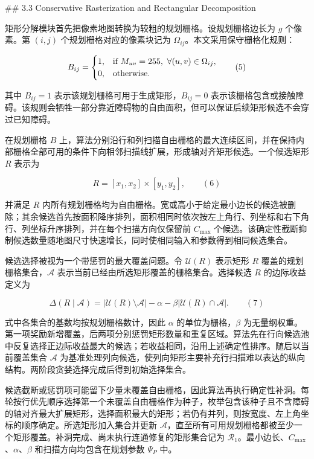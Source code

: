 ## 3.3 Conservative Rasterization and Rectangular Decomposition

  

矩形分解模块首先把像素地图转换为较粗的规划栅格。设规划栅格边长为 $g$ 个像素。第 $(i,j)$ 个规划栅格对应的像素块记为 $\Omega_{ij}$。本文采用保守栅格化规则：

  

$$
B_{ij}=
\begin{cases}
1, & \text{if } M_{uv}=255,\ \forall (u,v)\in\Omega_{ij},\cr
0, & \text{otherwise}.
\end{cases}
\qquad(5)
$$

  

其中 $B_{ij}=1$ 表示该规划栅格可用于生成矩形，$B_{ij}=0$ 表示该栅格包含或接触障碍。该规则会牺牲一部分靠近障碍物的自由面积，但可以保证后续矩形候选不会穿过已知障碍。

  

在规划栅格 $B$ 上，算法分别沿行和列扫描自由栅格的最大连续区间，并在保持内部栅格全部可用的条件下向相邻扫描线扩展，形成轴对齐矩形候选。一个候选矩形 $R$ 表示为

  

$$
R=[x_1,x_2]\times[y_1,y_2],
\qquad(6)
$$

  

并满足 $R$ 内所有规划栅格均为自由栅格。宽或高小于给定最小边长的候选被删除；其余候选首先按面积降序排列，面积相同时依次按左上角行、列坐标和右下角行、列坐标升序排列，并在每个扫描方向仅保留前 $C_{\max}$ 个候选。该确定性截断抑制候选数量随地图尺寸快速增长，同时使相同输入和参数得到相同候选集合。

  

候选选择被视为一个带惩罚的最大覆盖问题。令 $\mathcal U(R)$ 表示矩形 $R$ 覆盖的规划栅格集合，$\mathcal A$ 表示当前已经由所选矩形覆盖的栅格集合。选择候选 $R$ 的边际收益定义为

  

$$
\Delta(R\mid\mathcal A)
=|\mathcal U(R)\setminus\mathcal A|
-\alpha
-\beta|\mathcal U(R)\cap\mathcal A|.
\qquad(7)
$$

  

式中各集合的基数均按规划栅格数计，因此 $\alpha$ 的单位为栅格，$\beta$ 为无量纲权重。第一项奖励新增覆盖，后两项分别惩罚矩形数量和重复区域。算法先在行向候选池中反复选择正边际收益最大的候选；若收益相同，沿用上述确定性排序。随后以当前覆盖集合 $\mathcal A$ 为基准处理列向候选，使列向矩形主要补充行扫描难以表达的纵向结构。两阶段贪婪选择完成后得到初始选择集合。

候选截断或惩罚项可能留下少量未覆盖自由栅格，因此算法再执行确定性补洞。每轮按行优先顺序选择第一个未覆盖自由栅格作为种子，枚举包含该种子且不含障碍的轴对齐最大扩展矩形，选择面积最大的矩形；若仍有并列，则按宽度、左上角坐标的顺序确定。所选矩形加入集合并更新 $\mathcal A$，直至所有可用规划栅格都被至少一个矩形覆盖。补洞完成、尚未执行连通修复的矩形集合记为 $\mathcal R_1$。最小边长、$C_{\max}$、$\alpha$、$\beta$ 和扫描方向均包含在规划参数 $\Psi_P$ 中。

